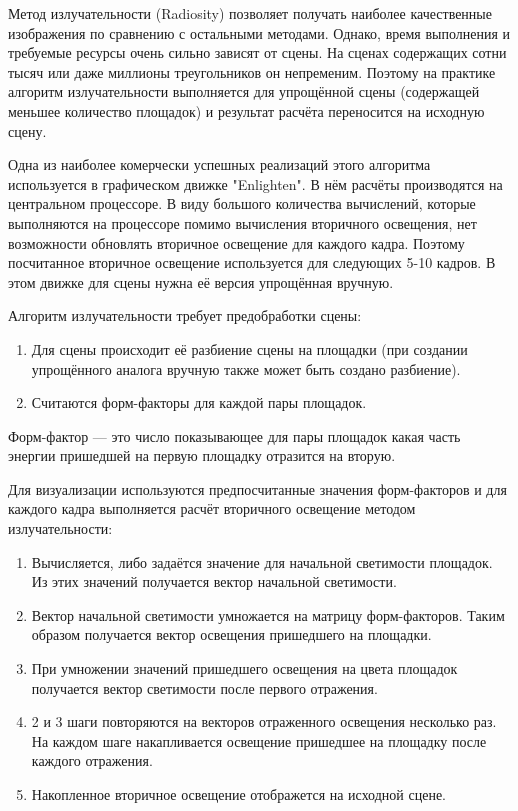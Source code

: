 \documentclass[12pt,fleqn]{article}
\begin{document}
Метод излучательности (Radiosity) позволяет получать наиболее качественные изображения по сравнению с остальными методами. Однако, время выполнения и требуемые ресурсы очень сильно зависят от сцены. На сценах содержащих сотни тысяч или даже миллионы треугольников он непременим. Поэтому на практике алгоритм излучательности выполняется для упрощённой сцены (содержащей меньшее количество площадок) и результат расчёта переносится на исходную сцену.

Одна из наиболее комерчески успешных реализаций этого алгоритма используется в графическом движке "Enlighten". В нём расчёты производятся на центральном процессоре. В виду большого количества вычислений, которые выполняются на процессоре помимо вычисления вторичного освещения, нет возможности обновлять вторичное освещение для каждого кадра. Поэтому посчитанное вторичное освещение используется для следующих 5-10 кадров. В этом движке для сцены нужна её версия упрощённая вручную.

Алгоритм излучательности требует предобработки сцены:

\begin{enumerate}

\item Для сцены происходит её разбиение сцены на площадки (при создании упрощённого аналога вручную также может быть создано разбиение).

\item Считаются форм-факторы для каждой пары площадок.

\end{enumerate}

Форм-фактор --- это число показывающее для пары площадок какая часть энергии пришедшей на первую площадку отразится на вторую.

Для визуализации используются предпосчитанные значения форм-факторов и для каждого кадра выполняется расчёт вторичного освещение методом излучательности:

\begin{enumerate}

\item Вычисляется, либо задаётся значение для начальной светимости площадок. Из этих значений получается вектор начальной светимости.

\item Вектор начальной светимости умножается на матрицу форм-факторов. Таким образом получается вектор освещения пришедшего на площадки.

\item При умножении значений пришедшего освещения на цвета площадок получается вектор светимости после первого отражения.

\item 2 и 3 шаги повторяются на векторов отраженного освещения несколько раз. На каждом шаге накапливается освещение пришедшее на площадку после каждого отражения.

\item Накопленное вторичное освещение отображется на исходной сцене.

\end{enumerate}
\end{document}
